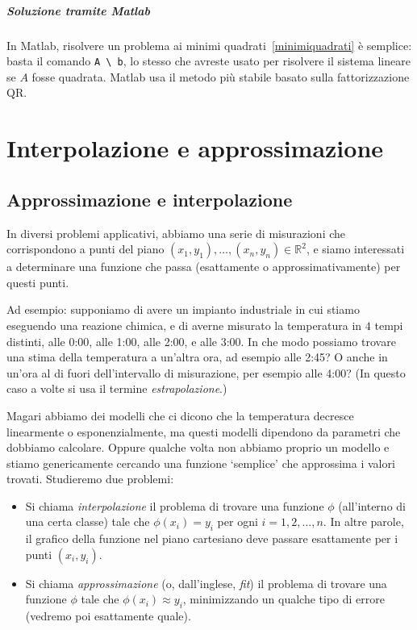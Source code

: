 \documentclass[a4paper]{report}
\theoremstyle{definition}
\theoremstyle{remark}
\begin{document}
\paragraph{Soluzione tramite Matlab} In Matlab, risolvere un problema ai minimi quadrati~\eqref{minimiquadrati} è semplice: basta il comando \lstinline{A \ b}, lo stesso che avreste usato per risolvere il sistema lineare se $A$ fosse quadrata. Matlab usa il metodo più stabile basato sulla fattorizzazione QR.

\chapter{Interpolazione e approssimazione}

\section{Approssimazione e interpolazione}

In diversi problemi applicativi, abbiamo una serie di misurazioni che corrispondono a punti del piano $(x_1, y_1), \dots, (x_n, y_n) \in \mathbb{R}^2$, e siamo interessati a determinare una funzione che passa (esattamente o approssimativamente) per questi punti.

Ad esempio: supponiamo di avere un impianto industriale in cui stiamo eseguendo una reazione chimica, e di averne misurato la temperatura in $4$ tempi distinti, alle 0:00, alle 1:00, alle 2:00, e alle 3:00. In che modo possiamo trovare una stima della temperatura a un'altra ora, ad esempio alle 2:45? O anche in un'ora al di fuori dell'intervallo di misurazione, per esempio alle 4:00? (In questo caso a volte si usa il termine \emph{estrapolazione}.)

Magari abbiamo dei modelli che ci dicono che la temperatura decresce linearmente o esponenzialmente, ma questi modelli dipendono da parametri che dobbiamo calcolare. Oppure qualche volta non abbiamo proprio un modello e stiamo genericamente cercando una funzione `semplice' che approssima i valori trovati. Studieremo due problemi:
\begin{itemize}
    \item Si chiama \emph{interpolazione} il problema di trovare una funzione $\phi$ (all'interno di una certa classe) tale che $\phi(x_i) = y_i$ per ogni $i=1,2,\dots, n$. In altre parole, il grafico della funzione nel piano cartesiano deve passare esattamente per i punti $(x_i, y_i)$.
    \item Si chiama \emph{approssimazione} (o, dall'inglese, \emph{fit}) il problema di trovare una funzione $\phi$ tale che $\phi(x_i) \approx y_i$, minimizzando un qualche tipo di errore (vedremo poi esattamente quale).
\end{itemize}
\end{document}

